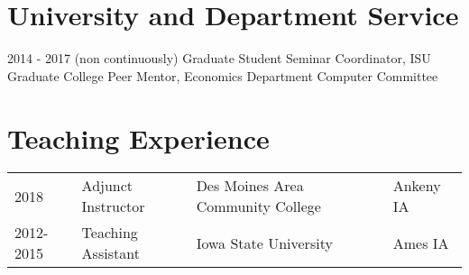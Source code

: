 \documentclass[letterpaper]{article}
\renewenvironment{itemize}{
  \begin{list}{}{
    \setlength{\leftmargin}{0em}
  }
}{
  \end{list}
}
\begin{document}
\section*{University and Department Service}

\begin{itemize}
\item 2014 - 2017 (non continuously) Graduate Student Seminar Coordinator, ISU Graduate College Peer Mentor, Economics Department Computer Committee
\end{itemize}

\section*{Teaching Experience}


\begin{tabular}{@{}llll}
2018 & Adjunct Instructor & Des Moines Area Community College & Ankeny IA \\
2012-2015 & Teaching Assistant & Iowa State University & Ames IA \\
\end{tabular}
\end{document}
